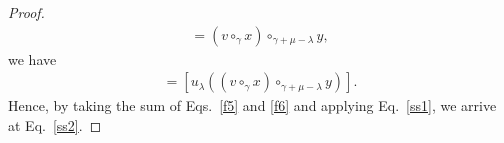 \documentclass[10pt,a4paper]{amsart}
\begin{document}
\begin{proof}
\begin{align*}
      =(v\circ_{\gamma}x)\circ_{\gamma+\mu-\lambda}y,
   \end{align*}
we have %
   \begin{align*}
        [u_{\lambda}(x\circ_{\mu-\lambda}(v\circ_{\gamma}y))]=[u_{\lambda}((v\circ_{\gamma}x)\circ_{\gamma+\mu-\lambda}y)].
   \end{align*}
Hence, by taking the sum of Eqs.~\eqref{f5} and \eqref{f6} and applying Eq.~\eqref{ss1}, we arrive at Eq.~\eqref{ss2}.
\end{proof}
\end{document}
